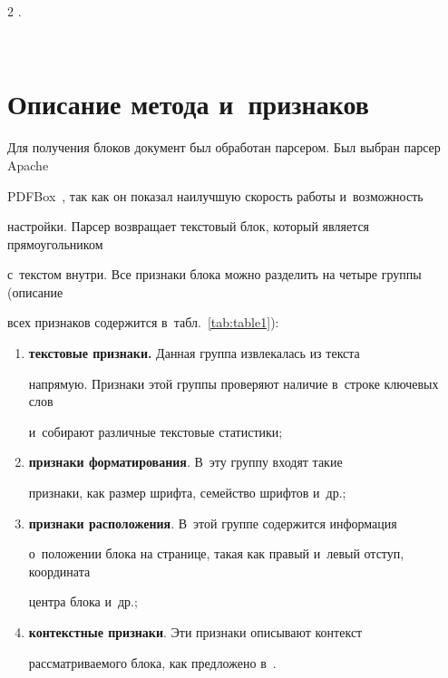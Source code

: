 \begin{multicols}{2}
{}\left[f({\bf{x}}_i) \ne y_i\right].


$$








\section{Описание метода и~признаков}





Для получения блоков документ был обработан парсером. Был выбран парсер Apache 


PDFBox~\cite{PDFBox}, так как он показал наилучшую ско\-рость работы и~воз\-мож\-ность 


на\-строй\-ки. Парсер возвращает текс\-то\-вый блок, который является прямоугольником 


с~текс\-том внут\-ри. Все признаки блока можно раз\-де\-лить на четыре группы (описание 


всех признаков содержится в~табл.~\ref{tab:table1}):


\begin{enumerate}[(1)]


\item \textbf{текстовые признаки.} Данная группа извлекалась из текс\-та 


напрямую. Признаки этой группы проверяют наличие в~строке клю\-че\-вых слов 


и~собирают различные текс\-то\-вые статистики;


\item \textbf{признаки форматирования}. В~эту группу входят такие 


при\-зна\-ки, как размер шриф\-та, семейство шриф\-тов и~др.;





\item \textbf{признаки расположения}. В~этой группе содержится информация 


о~положении блока на странице, такая как правый и~левый отступ, координата 


цент\-ра блока и~др.;


\item \textbf{контекстные признаки}. Эти признаки описывают контекст 


рас\-смат\-ри\-ва\-емо\-го блока, как пред\-ло\-же\-но в~\cite{Tao}.


\end{enumerate}






\end{multicols}
